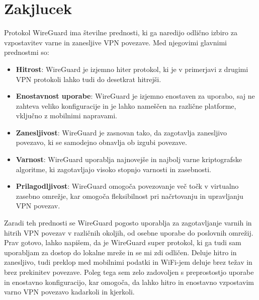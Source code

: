 \documentclass[a4paper, 11pt]{article}
\begin{document}
\section{Zakjlucek}
Protokol WireGuard ima številne prednosti, ki ga naredijo odlično izbiro za vzpostavitev varne in zanesljive VPN povezave. Med njegovimi glavnimi prednostmi so:

\begin{itemize}
    \item \textbf{Hitrost}: WireGuard je izjemno hiter protokol, ki je v primerjavi z drugimi VPN protokoli lahko tudi do desetkrat hitrejši.
    \item \textbf{Enostavnost uporabe}: WireGuard je izjemno enostaven za uporabo, saj ne zahteva veliko konfiguracije in je lahko nameščen na različne platforme, vključno z mobilnimi napravami.
    \item \textbf{Zanesljivost}: WireGuard je zasnovan tako, da zagotavlja zanesljivo povezavo, ki se samodejno obnavlja ob izgubi povezave.
    \item \textbf{Varnost}: WireGuard uporablja najnovejše in najbolj varne kriptografske algoritme, ki zagotavljajo visoko stopnjo varnosti in zasebnosti.
    \item \textbf{Prilagodljivost}: WireGuard omogoča povezovanje več točk v virtualno zasebno omrežje, kar omogoča fleksibilnost pri načrtovanju in upravljanju VPN povezav.
\end{itemize}

Zaradi teh prednosti se WireGuard pogosto uporablja za zagotavljanje varnih in hitrih VPN povezav v različnih okoljih, od osebne uporabe do poslovnih omrežij.
Prav gotovo, lahko napišem, da je WireGuard super protokol, ki ga tudi sam uporabljam za dostop do lokalne mreže in se mi zdi odličen. 
Deluje hitro in zanesljivo, tudi preklop med mobilnimi podatki in WiFi-jem deluje brez težav in brez prekinitev povezave. 
Poleg tega sem zelo zadovoljen s preprostostjo uporabe in enostavno konfiguracijo, kar omogoča, da lahko hitro in enostavno vzpostavim varno VPN povezavo 
kadarkoli in kjerkoli.



\end{document}
